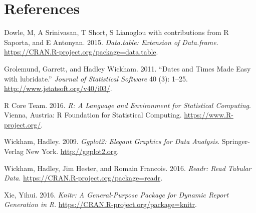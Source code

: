 \documentclass[]{article}
\begin{document}
\section*{References}\label{references}

\hypertarget{refs}{}
\hypertarget{ref-data.table}{}
Dowle, M, A Srinivasan, T Short, S Lianoglou with contributions from R
Saporta, and E Antonyan. 2015. \emph{Data.table: Extension of
Data.frame}. \url{https://CRAN.R-project.org/package=data.table}.

\hypertarget{ref-lubridate}{}
Grolemund, Garrett, and Hadley Wickham. 2011. ``Dates and Times Made
Easy with lubridate.'' \emph{Journal of Statistical Software} 40 (3):
1--25. \url{http://www.jstatsoft.org/v40/i03/}.

\hypertarget{ref-baseR}{}
R Core Team. 2016. \emph{R: A Language and Environment for Statistical
Computing}. Vienna, Austria: R Foundation for Statistical Computing.
\url{https://www.R-project.org/}.

\hypertarget{ref-ggplot2}{}
Wickham, Hadley. 2009. \emph{Ggplot2: Elegant Graphics for Data
Analysis}. Springer-Verlag New York. \url{http://ggplot2.org}.

\hypertarget{ref-readr}{}
Wickham, Hadley, Jim Hester, and Romain Francois. 2016. \emph{Readr:
Read Tabular Data}. \url{https://CRAN.R-project.org/package=readr}.

\hypertarget{ref-knitr}{}
Xie, Yihui. 2016. \emph{Knitr: A General-Purpose Package for Dynamic
Report Generation in R}. \url{https://CRAN.R-project.org/package=knitr}.
\end{document}
